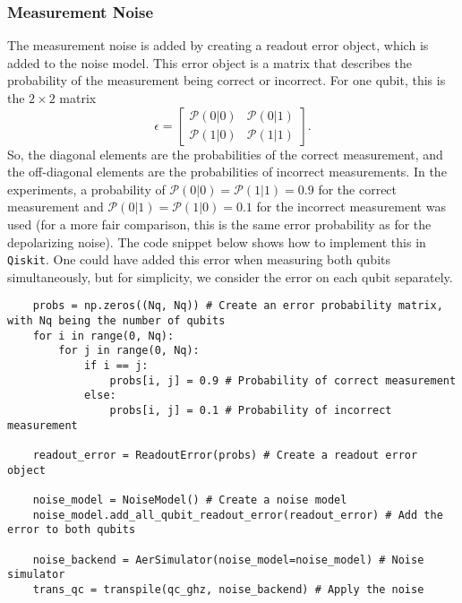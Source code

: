 \documentclass[a4paper,12pt]{article}
\begin{document}
\subsubsection{Measurement Noise}
The measurement noise is added by creating a readout error object, which is added to the noise model. This error object is a matrix that describes the probability of the measurement being correct or incorrect. For one qubit, this is the $2 \times 2$ matrix
\begin{equation}
    \epsilon = \begin{bmatrix}
        \mathcal{P}(0|0) & \mathcal{P}(0|1) \\
        \mathcal{P}(1|0) & \mathcal{P}(1|1)
    \end{bmatrix}.
\end{equation}
So, the diagonal elements are the probabilities of the correct measurement, and the off-diagonal elements are the probabilities of incorrect measurements. In the experiments, a probability of $\mathcal{P}(0|0) = \mathcal{P}(1|1) = 0.9$ for the correct measurement and $\mathcal{P}(0|1) = \mathcal{P}(1|0) = 0.1$ for the incorrect measurement was used (for a more fair comparison, this is the same error probability as for the depolarizing noise). The code snippet below shows how to implement this in \texttt{Qiskit}. One could have added this error when measuring both qubits simultaneously, but for simplicity, we consider the error on each qubit separately. 

\begin{tcolorbox}[title = {\footnotesize\textbf{Code Snippet, Measurement Noise Model}}, colback=black!15!white, colframe=black]
    \begin{adjustwidth}{0.25cm}{0cm}
    
    {\footnotesize 
    \begin{verbatim}
    probs = np.zeros((Nq, Nq)) # Create an error probability matrix, with Nq being the number of qubits
    for i in range(0, Nq):
        for j in range(0, Nq):
            if i == j:
                probs[i, j] = 0.9 # Probability of correct measurement
            else:
                probs[i, j] = 0.1 # Probability of incorrect measurement

    readout_error = ReadoutError(probs) # Create a readout error object
    
    noise_model = NoiseModel() # Create a noise model
    noise_model.add_all_qubit_readout_error(readout_error) # Add the error to both qubits
    
    noise_backend = AerSimulator(noise_model=noise_model) # Noise simulator
    trans_qc = transpile(qc_ghz, noise_backend) # Apply the noise
    \end{verbatim}
    }
    \end{adjustwidth}
\end{tcolorbox}
\end{document}
